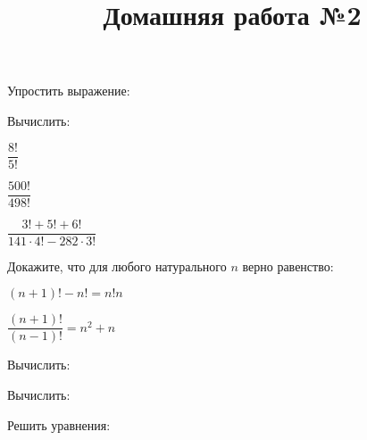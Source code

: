 \begin{listofex}
	\item Упростить выражение:
	\begin{enumcols}[itemcolumns=2]
		\item {}
		\item {}
	\end{enumcols}
	\item Вычислить:
	\begin{enumcols}[itemcolumns=3]
		\item \( \dfrac{8!}{5!} \)
		\item \( \dfrac{500!}{498!} \)
		\item \( \dfrac{3!+5!+6!}{141\cdot4!-282\cdot3!} \)
	\end{enumcols}
	\item Докажите, что для любого натурального \( n \) верно равенство:
	\begin{enumcols}[itemcolumns=2]
		\item \( (n+1)!-n! = n!n \)
		\item \( \dfrac{(n+1)!}{(n-1)!}=n^2+n \)
	\end{enumcols}
	\item {}
	\item Вычислить:
	\begin{enumcols}[itemcolumns=2]
		\item {}
		\item {}
		\item {}
	\end{enumcols}
	\item Вычислить:
	\begin{enumcols}[itemcolumns=2]
		\item {}
		\item {}
	\end{enumcols}
	\item Решить уравнения:
	\begin{enumcols}[itemcolumns=2]
		\item {}
		\item {}
	\end{enumcols}
\end{listofex}\newpage
\title{Домашняя работа №2}
